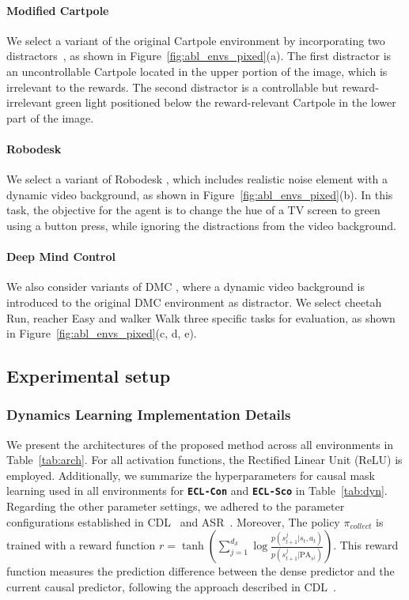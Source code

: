 \paragraph{Modified Cartpole}
We select a variant of the original Cartpole environment by incorporating two distractors~\citep{liu2024learning}, as shown in Figure~\ref{fig:abl_envs_pixed}(a). The first distractor is an uncontrollable Cartpole located in the upper portion of the image, which is irrelevant to the rewards. The second distractor is a controllable but reward-irrelevant green light positioned below the reward-relevant Cartpole in the lower part of the image.

\paragraph{Robodesk}
We select a variant of Robodesk \citep{kannan2021robodesk, wang2022robodesk}, which includes realistic noise element with a dynamic video background, as shown in Figure~\ref{fig:abl_envs_pixed}(b). In this task, the objective for the agent is to change the hue of a TV screen to green using a button press, while ignoring the distractions from the video background.

\paragraph{Deep Mind Control}
We also consider variants of DMC \citep{wang2022denoised, tassa2018deepmind}, where a dynamic video background is introduced to the original DMC environment as distractor. We select cheetah Run, reacher Easy and walker Walk three specific tasks for evaluation, as shown in Figure~\ref{fig:abl_envs_pixed}(c, d, e). 

\subsection{Experimental setup}
\label{Experimental setup}

\subsubsection{Dynamics Learning Implementation Details}
We present the architectures of the proposed method across all environments in Table~\ref{tab:arch}. For all activation functions, the Rectified Linear Unit (ReLU) is employed. Additionally, we summarize the hyperparameters for causal mask learning used in all environments for \texttt{\textbf{ECL-Con}} and \texttt{\textbf{ECL-Sco}} in Table~\ref{tab:dyn}. 
Regarding the other parameter settings, we adhered to the parameter configurations established in CDL~\citep{wang2022causal} and ASR~\citep{huang2022action}. Moreover, The policy $\pi_{collect}$ is trained with a reward function $r=\tanh ( {\textstyle \sum_{j=1}^{d_{\mathcal{S}}}}\log \frac{p(s^j_{t+1}|s_t,a_t)}{p(s^j_{t+1}|\mathrm{PA}_{s^j})} )$. This reward function measures the prediction difference between the dense predictor and the current causal predictor, following the approach described in CDL~\citep{wang2022causal}. 

